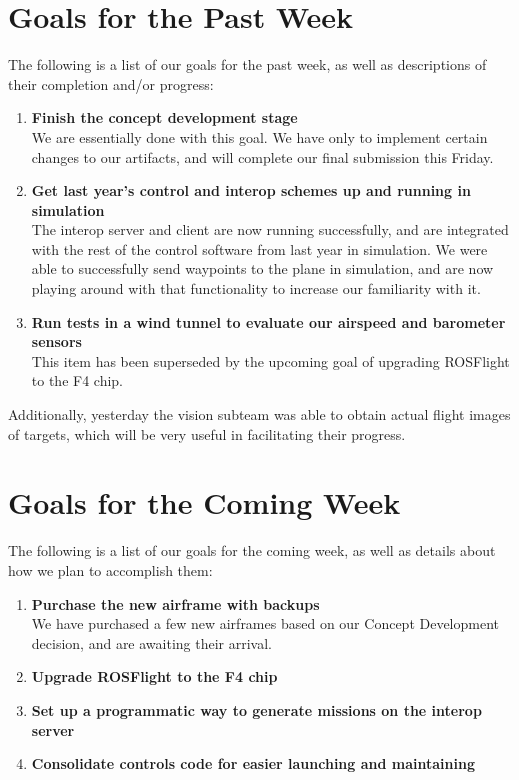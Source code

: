 \documentclass[]{../auvsi_doc}
\begin{document}
\section{Goals for the Past Week}

The following is a list of our goals for the past week, as well as descriptions of their completion and/or progress:

\begin{enumerate}
\item \textbf{Finish the concept development stage}\\
We are essentially done with this goal. We have only to implement certain changes to our artifacts, and will complete our final submission this Friday.
\item \textbf{Get last year's control and interop schemes up and running in simulation}\\
The interop server and client are now running successfully, and are integrated with the rest of the control software from last year in simulation. We were able to successfully send waypoints to the plane in simulation, and are now playing around with that functionality to increase our familiarity with it.
\item \textbf{Run tests in a wind tunnel to evaluate our airspeed and barometer sensors}\\
This item has been superseded by the upcoming goal of upgrading ROSFlight to the F4 chip.
\end{enumerate}

Additionally, yesterday the vision subteam was able to obtain actual flight images of targets, which will be very useful in facilitating their progress.

\section{Goals for the Coming Week}

The following is a list of our goals for the coming week, as well as details about how we plan to accomplish them:

\begin{enumerate}
\item \textbf{Purchase the new airframe with backups}\\
We have purchased a few new airframes based on our Concept Development decision, and are awaiting their arrival.
\item \textbf{Upgrade ROSFlight to the F4 chip}
\item \textbf{Set up a programmatic way to generate missions on the interop server}
\item \textbf{Consolidate controls code for easier launching and maintaining}
\end{enumerate}
\end{document}
